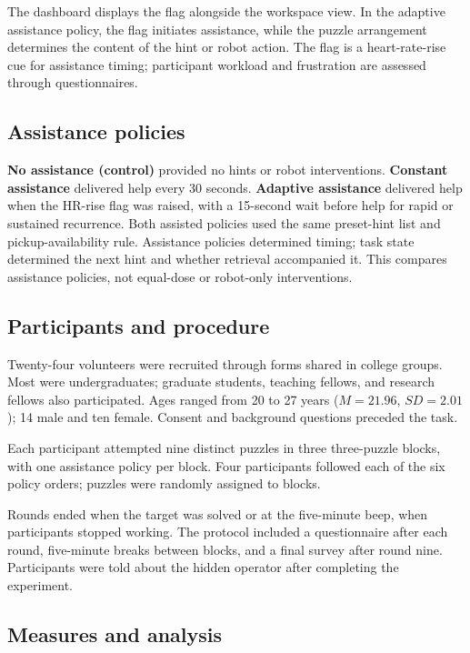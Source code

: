 \documentclass[sigconf,anonymous]{aamas}
\begin{document}
The dashboard displays the flag alongside the workspace view. In the adaptive assistance policy, the flag initiates assistance, while the puzzle arrangement determines the content of the hint or robot action. The flag is a heart-rate-rise cue for assistance timing; participant workload and frustration are assessed through questionnaires.

\subsection{Assistance policies}

\textbf{No assistance (control)} provided no hints or robot interventions. \textbf{Constant assistance} delivered help every 30 seconds. \textbf{Adaptive assistance} delivered help when the HR-rise flag was raised, with a 15-second wait before help for rapid or sustained recurrence. Both assisted policies used the same preset-hint list and pickup-availability rule. Assistance policies determined timing; task state determined the next hint and whether retrieval accompanied it. This compares assistance policies, not equal-dose or robot-only interventions.

\subsection{Participants and procedure}

Twenty-four volunteers were recruited through forms shared in college groups. Most were undergraduates; graduate students, teaching fellows, and research fellows also participated. Ages ranged from 20 to 27 years ($M=21.96$, $SD=2.01$); 14 male and ten female. Consent and background questions preceded the task.

Each participant attempted nine distinct puzzles in three three-puzzle blocks, with one assistance policy per block. Four participants followed each of the six policy orders; puzzles were randomly assigned to blocks. 

Rounds ended when the target was solved or at the five-minute beep, when participants stopped working. The protocol included a questionnaire after each round, five-minute breaks between blocks, and a final survey after round nine. Participants were told about the hidden operator after completing the experiment.

\subsection{Measures and analysis}
\end{document}
